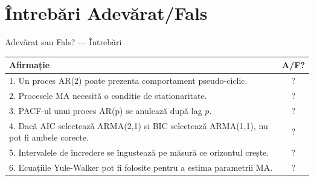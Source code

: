 \documentclass[9pt, aspectratio=169, t]{beamer}
\begin{document}
\section{Întrebări Adevărat/Fals}

\begin{frame}{Adevărat sau Fals? --- Întrebări}
    \footnotesize
    \begin{center}
    \begin{tabular}{p{9cm}c}
        \toprule
        \textbf{Afirmație} & \textbf{A/F?} \\
        \midrule
        1. Un proces AR(2) poate prezenta comportament pseudo-ciclic. & ? \\[0.15cm]
        2. Procesele MA necesită o condiție de staționaritate. & ? \\[0.15cm]
        3. PACF-ul unui proces AR(p) se anulează după lag $p$. & ? \\[0.15cm]
        4. Dacă AIC selectează ARMA(2,1) și BIC selectează ARMA(1,1), nu pot fi ambele corecte. & ? \\[0.15cm]
        5. Intervalele de încredere se îngustează pe măsură ce orizontul crește. & ? \\[0.15cm]
        6. Ecuațiile Yule-Walker pot fi folosite pentru a estima parametrii MA. & ? \\
        \bottomrule
    \end{tabular}
    \end{center}
\end{frame}
\end{document}

